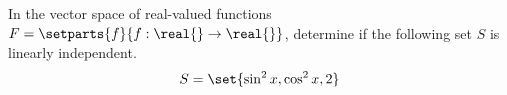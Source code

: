 In the vector space of real-valued functions $F = \setparts{f}{f:\real{\relax}\rightarrow\real{\relax}}$, determine if the following set $S$  is linearly independent.
\begin{equation*}
S = \set{\sin^2{x}, \cos^2{x}, 2}
\end{equation*}